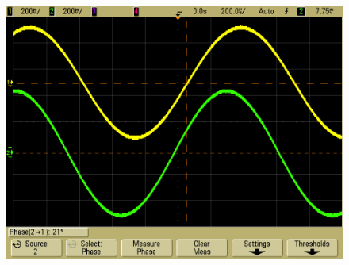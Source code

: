 \begin{frame}
\begin{columns}[c]
\begin{figure}[H]
\begin{center}
                \includegraphics[scale=0.1]{./img/oszi/scope_21.png}
        \end{center}
        \end{figure}
        
        
\end{columns}

\end{frame}

